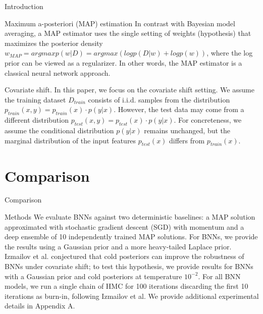 \documentclass{beamer}
\begin{document}
\begin{frame}{Introduction}
    \begin{block}{Maximum a-posteriori (MAP) estimation}
        In contrast with Bayesian model averaging, a MAP
        estimator uses the single setting of weights (hypothesis) that maximizes the posterior density
        $w_{MAP} = argmax p(w|D) = argmax(log p(D|w) + log p(w))$, where the log prior can be viewed
        as a regularizer. In other words, the MAP estimator is a classical neural network approach.
    \end{block}
    
    \begin{block}{Covariate shift.}
        In this paper, we focus on the covariate shift setting. We assume the training
        dataset $D_{train}$ consists of i.i.d. samples from the distribution $p_{train} (x, y) = p_{train} (x) · p(y|x)$. 
        However, the test data may come from a different distribution 
        $p_{test} (x, y) = p_{test} (x) · p(y|x)$. For concreteness,
        we assume the conditional distribution $p(y|x)$ remains unchanged, 
        but the marginal distribution of the input features $p_{test} (x)$ differs from $p_{train} (x)$.
    \end{block}
\end{frame}


\section{Comparison}
\begin{frame}{Comparison}
 \begin{block}{Methods}
    We evaluate BNNs against two deterministic baselines: a MAP solution approximated
    with stochastic gradient descent (SGD) with momentum and a deep ensemble of 10 independently 
    trained MAP solutions. For BNNs, we provide the results using a Gaussian prior and a
    more heavy-tailed Laplace prior. Izmailov et al. conjectured that
    cold posteriors can improve the robustness of BNNs under covariate shift; to test this hypothesis,
    we provide results for BNNs with a Gaussian prior and cold posteriors at temperature $10^{-2}$. For all
    BNN models, we run a single chain of HMC for 100 iterations discarding the first 10 iterations as
    burn-in, following Izmailov et al. We provide additional experimental details in Appendix A.
    \end{block}
\end{frame}
\end{document}
